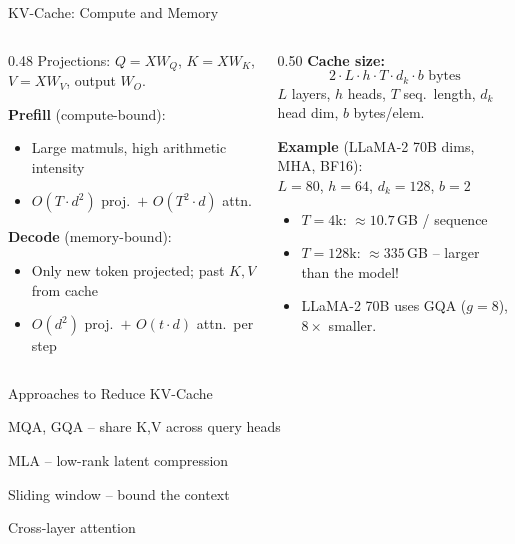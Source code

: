 \begin{frame}{KV-Cache: Compute and Memory}

  \begin{columns}[T]
    \begin{column}{0.48\textwidth}
      {\footnotesize Projections: $Q\!=\!XW_Q$, $K\!=\!XW_K$, $V\!=\!XW_V$, output $W_O$.}

      \textbf{Prefill} (compute-bound):
      \begin{itemize}
        \item Large matmuls, high arithmetic intensity
        \item $O(T \cdot d^2)$ proj.\ $+$ $O(T^2 \cdot d)$ attn.
      \end{itemize}

      \vspace{0.4em}
      \textbf{Decode} (memory-bound):
      \begin{itemize}
        \item Only new token projected; past $K,V$ from cache
        \item $O(d^2)$ proj.\ $+$ $O(t \cdot d)$ attn.\ per step
      \end{itemize}
    \end{column}
    \begin{column}{0.50\textwidth}
      \textbf{Cache size:}
      \[
        2 \cdot L \cdot h \cdot T \cdot d_k \cdot b \text{ bytes}
      \]
      {\footnotesize $L$ layers, $h$ heads, $T$ seq.\ length, $d_k$ head dim, $b$ bytes/elem.}

      \vspace{0.4em}
      \textbf{Example} (LLaMA-2 70B dims, MHA, BF16):\\
      $L{=}80$, $h{=}64$, $d_k{=}128$, $b{=}2$
      \begin{itemize}
        \item $T{=}4$k: $\approx 10.7$\,GB / sequence
        \item $T{=}128$k: $\approx 335$\,GB -- larger than the model!
        \item LLaMA-2 70B uses GQA ($g{=}8$), $8\times$ smaller.
      \end{itemize}
    \end{column}
  \end{columns}

  \vspace{0.3em}
  \begin{alertblock}{\small Approaches to Reduce KV-Cache}
    \begin{description}[labelwidth=3cm, leftmargin=3.2cm, font=\small]
      \item[Fewer KV heads] MQA, GQA -- share K,V across query heads
      \item[Compress KV] MLA -- low-rank latent compression
      \item[Fewer tokens] Sliding window -- bound the context
      \item[Share across layers] Cross-layer attention
    \end{description}
  \end{alertblock}

\end{frame}

